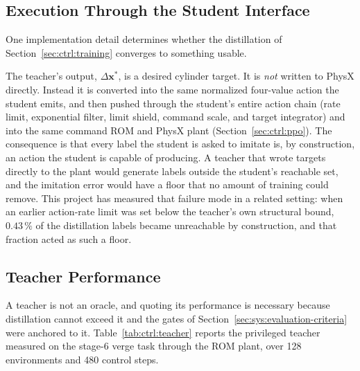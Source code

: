 \subsection{Execution Through the Student Interface}

One implementation detail determines whether the distillation of
Section~\ref{sec:ctrl:training} converges to something usable.

The teacher's output, $\Delta\bm{x}^{*}$, is a desired cylinder target. It is
\emph{not} written to PhysX directly. Instead it is converted into the same
normalized four-value action the student emits, and then pushed through the student's entire action chain
(rate limit, exponential filter, limit shield, command scale, and target
integrator) and into the same command ROM and PhysX
plant (Section~\ref{sec:ctrl:ppo}). The consequence is that every label the
student is asked to imitate is, by construction, an action the student is
capable of producing. A teacher that wrote targets directly to the plant would
generate labels outside the student's reachable set, and the imitation error
would have a floor that no amount of training could remove. This project has
measured that failure mode in a related setting: when an earlier action-rate
limit was set below the teacher's own structural bound, $0.43\,\%$ of the
distillation labels became unreachable by construction, and that fraction acted as such a floor.

\subsection{Teacher Performance}

A teacher is not an oracle, and quoting its performance is necessary because
distillation cannot exceed it and the gates of
Section~\ref{sec:sys:evaluation-criteria} were anchored to it.
Table~\ref{tab:ctrl:teacher} reports the privileged teacher measured on the
stage-6 verge task through the ROM plant, over 128 environments and 480 control
steps.

